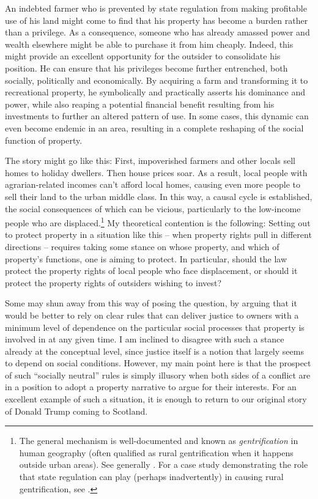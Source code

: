 An indebted farmer who is prevented by state regulation from making profitable use of his land might come to find that his property has become a burden rather than a privilege. As a consequence, someone who has already amassed power and wealth elsewhere might be able to purchase it from him cheaply. Indeed, this might provide an excellent opportunity for the outsider to consolidate his position. He can ensure that his privileges become further entrenched, both socially, politically and economically. By acquiring a farm and transforming it to recreational property, he symbolically and practically asserts his dominance and power, while also reaping a potential financial benefit resulting from his investments to further an altered pattern of use. In some cases, this dynamic can even become endemic in an area, resulting in a complete reshaping of the social function of property.

The story might go like this: First, impoverished farmers and other locals sell homes to holiday dwellers. Then house prices soar. As a result, local people with agrarian-related incomes can't afford local homes, causing even more people to sell their land to the urban middle class. In this way, a causal cycle is established, the social consequences of which can be vicious, particularly to the low-income people who are displaced.\footnote{The general mechanism is well-documented and known as {\it gentrification} in human geography (often qualified as rural gentrification when it happens outside urban areas). See generally \cite{weesep94,phillips93,slater06}. For a case study demonstrating the role that state regulation can play (perhaps inadvertently) in causing rural gentrification, see \cite[1027-1030]{darling05}.} My theoretical contention is the following: Setting out to protect property in a situation like this -- when property rights pull in different directions -- requires taking some stance on whose property, and which of property's functions, one is aiming to protect. In particular, should the law protect the property rights of local people who face displacement, or should it protect the property rights of outsiders wishing to invest?

Some may shun away from this way of posing the question, by arguing that it would be better to rely on clear rules that can deliver justice to owners with a minimum level of dependence on the particular social processes that property is involved in at any given time. I am inclined to disagree with such a stance already at the conceptual level, since justice itself is a notion that largely seems to depend on social conditions. However, my main point here is that the prospect of such ``socially neutral'' rules is simply illusory when both sides of a conflict are in a position to adopt a property narrative to argue for their interests. For an excellent example of such a situation, it is enough to return to our original story of Donald Trump coming to Scotland. 

